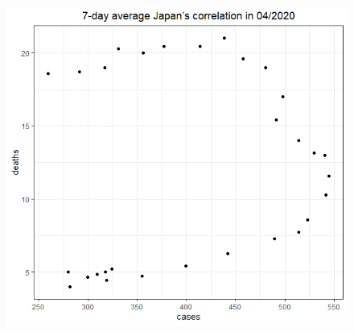 \documentclass[english,10pt,table]{beamer}
\begin{document}
{\begin{figure}[H]
\begin{center}
        \includegraphics[scale = 0.2]{ix/ix.3/JPN_04_2020.png}
        

\end{center}
\end{figure}}
\end{document}
